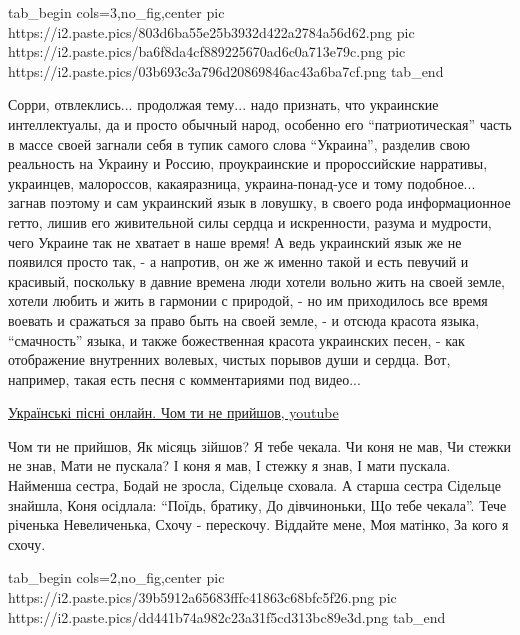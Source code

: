 \ifcmt
  tab_begin cols=3,no_fig,center
     pic https://i2.paste.pics/803d6ba55e25b3932d422a2784a56d62.png
		 pic https://i2.paste.pics/ba6f8da4cf889225670ad6c0a713e79c.png
		 pic https://i2.paste.pics/03b693c3a796d20869846ac43a6ba7cf.png
  tab_end
\fi

Сорри, отвлеклись... продолжая тему... надо признать, что украинские
интеллектуалы, да и просто обычный народ, особенно его \enquote{патриотическая}
часть в массе своей загнали себя в тупик самого слова \enquote{Украина},
разделив свою реальность на Украину и Россию, проукраинские и пророссийские
нарративы, украинцев, малороссов, какаяразница, украина-понад-усе и тому
подобное... загнав поэтому и сам украинский язык в ловушку, в своего рода
информационное гетто, лишив его живительной силы сердца и искренности, разума и
мудрости, чего Украине так не хватает в наше время! А ведь украинский язык же
не появился просто так, - а напротив, он же ж именно такой и есть певучий и
красивый, поскольку в давние времена люди хотели вольно жить на своей земле,
хотели любить и жить в гармонии с природой, - но им приходилось все время
воевать и сражаться за право быть на своей земле, - и отсюда красота языка,
\enquote{смачность} языка,  и также божественная красота украинских песен, -
как отображение внутренних волевых, чистых порывов души и сердца. Вот,
например, такая есть песня с комментариями под видео... 

\href{https://www.youtube.com/watch?v=--iWRp8Jr6k}{%
Українські пісні онлайн. Чом ти не прийшов, youtube}

\raggedcolumns
\begin{multicols}{4} %
\setlength{\parindent}{0pt}
\obeycr
Чом ти не прийшов,
Як місяць зійшов?
Я тебе чекала.
Чи коня не мав,
Чи стежки не знав,
Мати не пускала?
\smallskip
І коня я мав,
І стежку я знав,
І мати пускала.
Найменша сестра,
Бодай не зросла,
Сідельце сховала.
\smallskip
А старша сестра
Сідельце знайшла,
Коня осідлала:
\enquote{Поїдь, братику,
До дівчиноньки,
Що тебе чекала}.
\smallskip
Тече річенька
Невеличенька,
Схочу - перескочу.
Віддайте мене,
Моя матінко,
За кого я схочу.
\restorecr
\end{multicols} %

\ifcmt
  tab_begin cols=2,no_fig,center
     pic https://i2.paste.pics/39b5912a65683fffc41863c68bfc5f26.png
		 pic https://i2.paste.pics/dd441b74a982c23a31f5cd313bc89e3d.png
  tab_end
\fi

